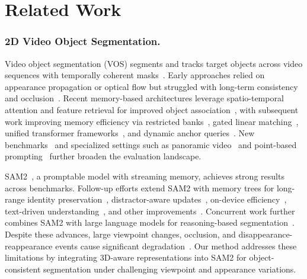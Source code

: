 \vspace{-1.5em}
\section{Related Work}
\label{sec:related}
\vspace{-1em}

\subsubsection{2D Video Object Segmentation.}
Video object segmentation (VOS) segments and tracks target objects across video sequences with temporally coherent masks~\cite{perazzi2016benchmark, caelles2017one, voigtlaender2019feelvos, maninis2018video, wu2025denver}. Early approaches relied on appearance propagation or optical flow but struggled with long-term consistency and occlusion~\cite{yang2019video, oh2019video, bhat2020learning}. Recent memory-based architectures leverage spatio-temporal attention and feature retrieval for improved object association~\cite{yang2021associating, cheng2022xmem, cheng2021rethinking, liu2022learning, park2022per, xu2022reliable, yang2024scalable, yang2022decoupling, li2024univs, cheng2024putting}, with subsequent work improving memory efficiency via restricted banks~\cite{zhou2024rmem}, gated linear matching~\cite{liu2025livos}, unified transformer frameworks~\cite{li2024onevos, zhang2025jointformer}, and dynamic anchor queries~\cite{zhou2024improving}. New benchmarks~\cite{hong2023lvos} and specialized settings such as panoramic video~\cite{yan2024panovos} and point-based prompting~\cite{mahadevan2024point} further broaden the evaluation landscape.

SAM2~\cite{ravi2024sam2}, a promptable model with streaming memory, achieves strong results across benchmarks. Follow-up efforts extend SAM2 with memory trees for long-range identity preservation~\cite{ding2024sam2long}, distractor-aware updates~\cite{videnovic2025distractor}, on-device efficiency~\cite{zhou2025edgetam}, text-driven understanding~\cite{cuttano2025samwise}, and other improvements~\cite{yang2024samurai, yang2025mosam, ye2025entitysam}. Concurrent work further combines SAM2 with large language models for reasoning-based segmentation~\cite{yuan2025sa2va, yan2024visa, bai2024one}. Despite these advances, large viewpoint changes, occlusion, and disappearance-reappearance events cause significant degradation~\cite{ding2025mosev2, xu2018youtube, perazzi2017davis}. Our method addresses these limitations by integrating 3D-aware representations into SAM2 for object-consistent segmentation under challenging viewpoint and appearance variations.

